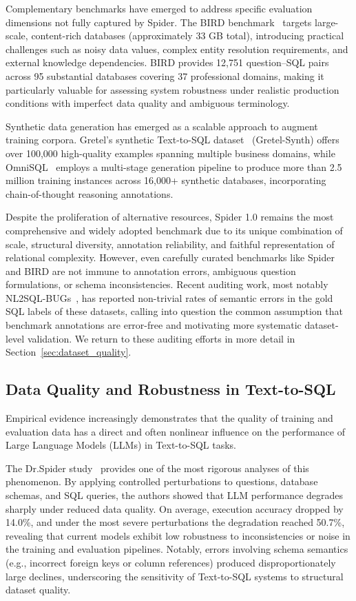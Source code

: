 \documentclass[]{einformatica}
\begin{document}
Complementary benchmarks have emerged to address specific evaluation dimensions not fully captured by Spider. The BIRD benchmark~\cite{li2023bird} targets large-scale, content-rich databases (approximately 33 GB total), introducing practical challenges such as noisy data values, complex entity resolution requirements, and external knowledge dependencies. BIRD provides 12,751 question--SQL pairs across 95 substantial databases covering 37 professional domains, making it particularly valuable for assessing system robustness under realistic production conditions with imperfect data quality and ambiguous terminology.

Synthetic data generation has emerged as a scalable approach to augment training corpora. Gretel's synthetic Text-to-SQL dataset~\cite{gretelSynthDataset} (Gretel-Synth) offers over 100,000 high-quality examples spanning multiple business domains, while OmniSQL~\cite{li2025omnisql} employs a multi-stage generation pipeline to produce more than 2.5 million training instances across 16,000+ synthetic databases, incorporating chain-of-thought reasoning annotations. 

Despite the proliferation of alternative resources, Spider 1.0 remains the most comprehensive and widely adopted benchmark due to its unique combination of scale, structural diversity, annotation reliability, and faithful representation of relational complexity. However, even carefully curated benchmarks like Spider and BIRD are not immune to annotation errors, ambiguous question formulations, or schema inconsistencies. Recent auditing work, most notably NL2SQL-BUGs~\cite{liu2025nl2sqlbugs}, has reported non-trivial rates of semantic errors in the gold SQL labels of these datasets, calling into question the common assumption that benchmark annotations are error-free and motivating more systematic dataset-level validation. We return to these auditing efforts in more detail in Section~\ref{sec:dataset_quality}.

\subsection{Data Quality and Robustness in Text-to-SQL}

Empirical evidence increasingly demonstrates that the quality of training and evaluation data has a direct and often nonlinear influence on the performance of Large Language Models (LLMs) in Text-to-SQL tasks. 

The Dr.Spider study~\cite{chang2023drspider} provides one of the most rigorous analyses of this phenomenon. By applying controlled perturbations to questions, database schemas, and SQL queries, the authors showed that LLM performance degrades sharply under reduced data quality. On average, execution accuracy dropped by 14.0\%, and under the most severe perturbations the degradation reached 50.7\%, revealing that current models exhibit low robustness to inconsistencies or noise in the training and evaluation pipelines. Notably, errors involving schema semantics (e.g., incorrect foreign keys or column references) produced disproportionately large declines, underscoring the sensitivity of Text-to-SQL systems to structural dataset quality.
\end{document}

